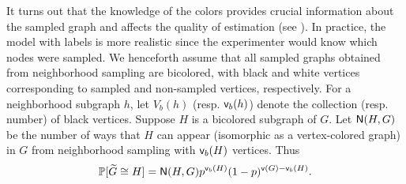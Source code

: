 It turns out that the knowledge of the colors provides crucial information about the sampled graph and affects the quality of estimation (see ). In practice, the model with labels is more realistic since the experimenter would know which nodes were sampled.
We henceforth assume that all sampled graphs obtained from neighborhood sampling are bicolored, with black and white vertices corresponding to sampled and non-sampled vertices, respectively. For a neighborhood subgraph $ h $, let $ V_{b}(h) $ (resp. $ {\mathsf{v}}_{b}(h) $) denote the collection (resp. number) of black vertices. Suppose $ H $ is a bicolored subgraph of $ G $. Let $ {\mathsf{N}}(H, G) $ be the number of ways that $ H $ can appear (isomorphic as a vertex-colored graph) in $ G $ from neighborhood sampling with $ {\mathsf{v}}_{b}(H) $ vertices. Thus
\begin{equation*} 
\mathbb{P}[{\widetilde{G}} \cong H] = {\mathsf{N}}(H, G){p^{{\mathsf{v}}_b(H)}(1-p)^{{\mathsf{v}}(G)-{\mathsf{v}}_b(H)}}.
\end{equation*}

%

